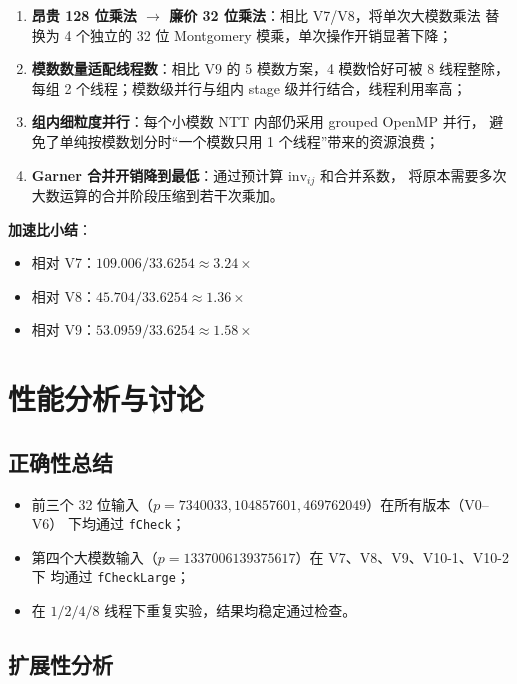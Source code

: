 \documentclass[UTF8,a4paper,10pt]{ctexart}
\begin{document}
\begin{enumerate}
  \item \textbf{昂贵 128 位乘法 $\to$ 廉价 32 位乘法}：相比 V7/V8，将单次大模数乘法
        替换为 4 个独立的 32 位 Montgomery 模乘，单次操作开销显著下降；
  \item \textbf{模数数量适配线程数}：相比 V9 的 5 模数方案，4 模数恰好可被 8 线程整除，
        每组 2 个线程；模数级并行与组内 stage 级并行结合，线程利用率高；
  \item \textbf{组内细粒度并行}：每个小模数 NTT 内部仍采用 grouped OpenMP 并行，
        避免了单纯按模数划分时``一个模数只用 1 个线程''带来的资源浪费；
  \item \textbf{Garner 合并开销降到最低}：通过预计算 $\mathrm{inv}_{ij}$ 和合并系数，
        将原本需要多次大数运算的合并阶段压缩到若干次乘加。
\end{enumerate}

\textbf{加速比小结}：

\begin{itemize}
  \item 相对 V7：$109.006 / 33.6254 \approx 3.24\times$
  \item 相对 V8：$45.704 / 33.6254 \approx 1.36\times$
  \item 相对 V9：$53.0959 / 33.6254 \approx 1.58\times$
\end{itemize}

\section{性能分析与讨论}

\subsection{正确性总结}

\begin{itemize}
  \item 前三个 32 位输入（$p = 7340033, 104857601, 469762049$）在所有版本（V0--V6）
        下均通过 \texttt{fCheck}；
  \item 第四个大模数输入（$p = 1337006139375617$）在 V7、V8、V9、V10-1、V10-2 下
        均通过 \texttt{fCheckLarge}；
  \item 在 $1/2/4/8$ 线程下重复实验，结果均稳定通过检查。
\end{itemize}

\subsection{扩展性分析}
\end{document}
